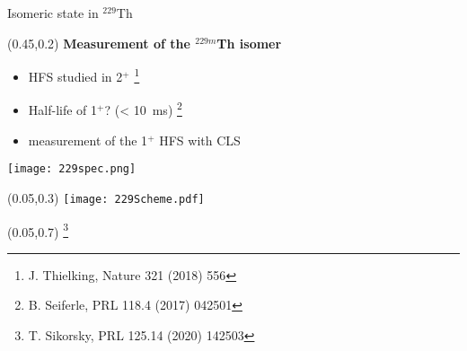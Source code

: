 \documentclass[10pt,aspectratio=169]{beamer}
\begin{document}
\begin{frame}{Isomeric state in $^{229}$Th}
	\begin{textblock*}{0.6\paperwidth}(0.45\paperwidth,0.2\paperheight)
		\textbf{Measurement of the $^{229m}$Th isomer}
		\begin{itemize}
			\item HFS studied in 2$^+$ \footnote{J. Thielking, Nature 321 (2018) 556}
			\item Half-life of 1$^+$? (< 10~ms) \footnote{B. Seiferle, PRL 118.4 (2017) 042501}
			\item measurement of the 1$^+$ HFS with CLS
		\end{itemize}
		
		\texttt{[image: 229spec.png]}
	\end{textblock*}
	\begin{textblock*}{0.33\paperwidth}(0.05\paperwidth,0.3\paperheight)
		\centering
		\texttt{[image: 229Scheme.pdf]}
	\end{textblock*}
	\begin{textblock*}{0.1\paperwidth}(0.05\paperwidth,0.7\paperheight)
		\footnote{ T. Sikorsky, PRL 125.14 (2020) 142503}
	\end{textblock*}
\end{frame}
\end{document}
